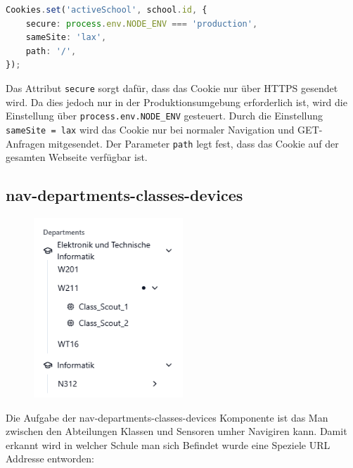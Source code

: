 \begin{inhalt}
\begin{enumerate}[label=\textbf{\arabic*.}]
\begin{lstlisting}[language=TypeScript]
Cookies.set('activeSchool', school.id, {
    secure: process.env.NODE_ENV === 'production',
    sameSite: 'lax',
    path: '/',
});
\end{lstlisting}

Das Attribut \texttt{secure} sorgt dafür, dass das Cookie nur über HTTPS gesendet wird.  
Da dies jedoch nur in der Produktionsumgebung erforderlich ist, wird die Einstellung über \texttt{process.env.NODE\_ENV} gesteuert.  
Durch die Einstellung \texttt{sameSite = lax} wird das Cookie nur bei normaler Navigation und GET-Anfragen mitgesendet.  
Der Parameter \texttt{path} legt fest, dass das Cookie auf der gesamten Webseite verfügbar ist.











\subsection{nav-departments-classes-devices}


\begin{figure}[!htb]
\centering
\includegraphics[width=0.5\textwidth]{files/Thomas/pics/Website/Sidebar/nav-departments-classes-devices/nav-screen.png}
\caption[Bildbezeichnung für Abbildungsverzeichnis]{}
\label{fig:gehaeuse_internet_bild}
\end{figure}



Die Aufgabe der nav-departments-classes-devices Komponente ist das Man zwischen den Abteilungen Klassen und Sensoren umher Navigiren kann. Damit erkannt wird in welcher Schule man sich Befindet wurde eine Speziele URL Addresse entworden:


\end{enumerate}
\end{inhalt}
